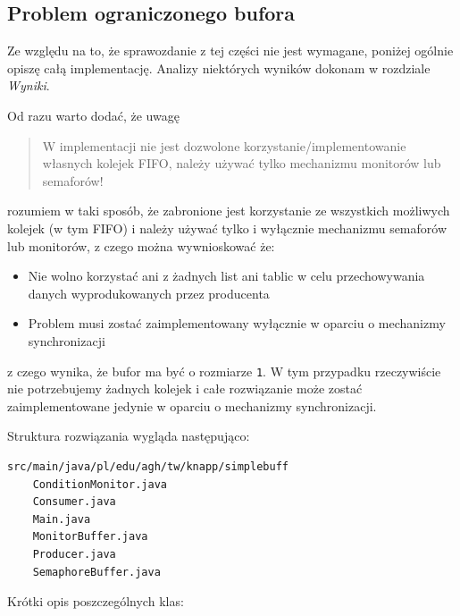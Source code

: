 \documentclass[11pt]{article}
\providecommand{\tightlist}{%
      \setlength{\itemsep}{0pt}\setlength{\parskip}{0pt}}
\begin{document}
    \hypertarget{problem-ograniczonego-bufora}{%
\subsection{Problem ograniczonego
bufora}\label{problem-ograniczonego-bufora}}

Ze względu na to, że sprawozdanie z tej części nie jest wymagane,
poniżej ogólnie opiszę całą implementację. Analizy niektórych wyników
dokonam w rozdziale \emph{Wyniki}.

Od razu warto dodać, że uwagę

\begin{quote}
W implementacji nie jest dozwolone korzystanie/implementowanie własnych
kolejek FIFO, należy używać tylko mechanizmu monitorów lub semaforów!
\end{quote}

rozumiem w taki sposób, że zabronione jest korzystanie ze wszystkich
możliwych kolejek (w tym FIFO) i należy używać tylko i wyłącznie
mechanizmu semaforów lub monitorów, z czego można wywnioskować że:

\begin{itemize}
\tightlist
\item
  Nie wolno korzystać ani z żadnych list ani tablic w celu
  przechowywania danych wyprodukowanych przez producenta
\item
  Problem musi zostać zaimplementowany wyłącznie w oparciu o mechanizmy
  synchronizacji
\end{itemize}

z czego wynika, że bufor ma być o rozmiarze \texttt{1}. W tym przypadku
rzeczywiście nie potrzebujemy żadnych kolejek i całe rozwiązanie może
zostać zaimplementowane jedynie w oparciu o mechanizmy synchronizacji.

Struktura rozwiązania wygląda następująco:

\begin{verbatim}
src/main/java/pl/edu/agh/tw/knapp/simplebuff
    ConditionMonitor.java
    Consumer.java
    Main.java
    MonitorBuffer.java
    Producer.java
    SemaphoreBuffer.java
\end{verbatim}

Krótki opis poszczególnych klas:
\end{document}

